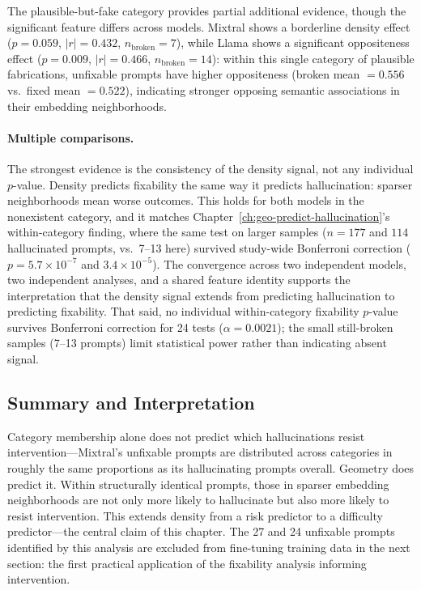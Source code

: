 The plausible-but-fake category provides partial additional evidence, though the significant feature differs across models. Mixtral shows a borderline density effect ($p = 0.059$, $|r| = 0.432$, $n_{\text{broken}} = 7$), while Llama shows a significant oppositeness effect ($p = 0.009$, $|r| = 0.466$, $n_{\text{broken}} = 14$): within this single category of plausible fabrications, unfixable prompts have higher oppositeness (broken mean $= 0.556$ vs.\ fixed mean $= 0.522$), indicating stronger opposing semantic associations in their embedding neighborhoods.

\paragraph{Multiple comparisons.} The strongest evidence is the consistency of the density signal, not any individual $p$-value. Density predicts fixability the same way it predicts hallucination: sparser neighborhoods mean worse outcomes. This holds for both models in the nonexistent category, and it matches Chapter~\ref{ch:geo-predict-hallucination}'s within-category finding, where the same test on larger samples ($n = 177$ and $114$ hallucinated prompts, vs.\ 7--13 here) survived study-wide Bonferroni correction ($p = 5.7 \times 10^{-7}$ and $3.4 \times 10^{-5}$). The convergence across two independent models, two independent analyses, and a shared feature identity supports the interpretation that the density signal extends from predicting hallucination to predicting fixability. That said, no individual within-category fixability $p$-value survives Bonferroni correction for 24 tests ($\alpha = 0.0021$); the small still-broken samples (7--13 prompts) limit statistical power rather than indicating absent signal.

\subsection{Summary and Interpretation}
\label{sec:fixability-summary}

Category membership alone does not predict which hallucinations resist intervention---Mixtral's unfixable prompts are distributed across categories in roughly the same proportions as its hallucinating prompts overall. Geometry does predict it. Within structurally identical prompts, those in sparser embedding neighborhoods are not only more likely to hallucinate but also more likely to resist intervention. This extends density from a risk predictor to a difficulty predictor---the central claim of this chapter. The 27 and 24 unfixable prompts identified by this analysis are excluded from fine-tuning training data in the next section: the first practical application of the fixability analysis informing intervention.


